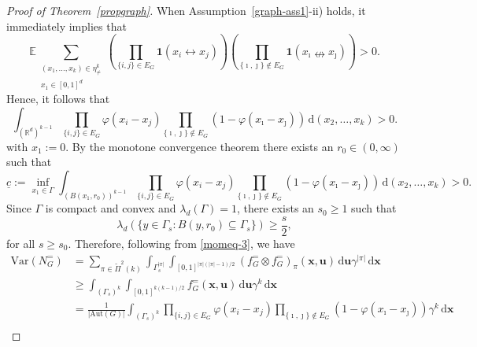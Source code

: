 \documentclass{article}
\theoremstyle{definition}
\numberwithin{equation}{section}
\theoremstyle{remark}
\newcommand{\Var}{\mathrm{Var}}
\begin{document}
\begin{proof}[Proof of Theorem~\ref{propgraph}]

When Assumption~\ref{graph-ass1}-ii) holds, it immediately implies that 
\begin{equation*}
	\mathbb{E}\sum_{\substack{(x_1,\dots,x_k)\in\eta^k_{\ne}\\ x_1\in[0,1]^d}}\left(\prod_{\{i,j\}\in E_G}\mathbf{1}(x_i\leftrightarrow x_j)\right)\left(\prod_{\{\imath,\jmath\}\notin E_G}\mathbf{1}(x_{\imath}\nleftrightarrow x_{\jmath})\right) >0.
\end{equation*}
Hence, it follows that
$$
\int_{(\mathbb{R}^d)^{k-1}} \prod_{\{i,j\}\in E_G}\varphi(x_i-x_j)\prod_{\{\imath,\jmath\}\notin E_G}(1-\varphi(x_{\imath}-x_{\jmath}))\,\mathrm{d}(x_2,\dots,x_k)>0.
$$
with $x_1:=0$. By the monotone convergence theorem there exists an $r_0\in(0,\infty)$ such that
$$
\underline{c}:=\inf_{x_1\in\Gamma}\int_{(B(x_1,r_0))^{k-1}} \prod_{\{i,j\}\in E_G}\varphi(x_i-x_j)\prod_{\{\imath,\jmath\}\notin E_G}(1-\varphi(x_{\imath}-x_{\jmath}))\,\mathrm{d}(x_2,\dots,x_k)>0.
$$
Since $\Gamma$ is compact and convex and $\lambda_d(\Gamma)=1$, there exists an $s_0\geq 1$ such that
$$
\lambda_d(\{ y\in\Gamma_s: B(y,r_0)\subseteq\Gamma_s \})\geq \frac{s}{2},
$$
for all $s\ge s_0$.
Therefore, following from \eqref{momeq-3}, we have
\begin{align}
\Var(N_G^{=})
&=\sum_{\pi\in\widetilde{\Pi}^2(k)}\int_{\Gamma_s^{|\pi|}}\int_{[0,1]^{|\pi|(|\pi|-1)/2}}(f^{=}_G\otimes f^{=}_G)_{\pi}(\bm{x},\bm{u})\,\mathrm{d}\bm{u}\gamma^{|\pi|}\,\mathrm{d}\bm{x}\nonumber\\
	&\ge\int_{(\Gamma_s)^{k}}\int_{[0,1]^{k(k-1)/2}}f^{=}_G(\bm{x},\bm{u})\,\mathrm{d}\bm{u}\gamma^{k}\,\mathrm{d}\bm{x}\nonumber\\
	&=\frac{1}{|\mathrm{Aut}(G)|}\int_{(\Gamma_s)^k}\prod_{\{i,j\}\in E_G}\varphi(x_i-x_j)\prod_{\{\imath,\jmath\}\notin E_G}(1-\varphi(x_{\imath}-x_{\jmath}))\gamma^k\,\mathrm{d}\bm{x}\nonumber\\

\end{align}
\end{proof}
\end{document}
